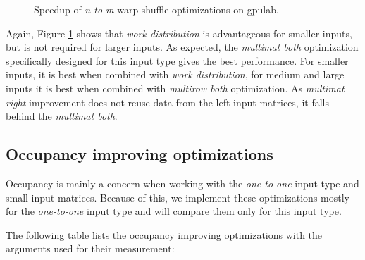 \begin{figure}[ht]
	\centering	
	\begin{subfigure}{0.49\textwidth}
		\centering
		\def\svgwidth{\textwidth}
		
	\end{subfigure}
	\hfill
	\begin{subfigure}{0.49\textwidth}
		\centering
		\def\svgwidth{\textwidth}
		
	\end{subfigure}
	\hfill
	\begin{subfigure}{0.49\textwidth}
		\centering
		\def\svgwidth{\textwidth}
		
	\end{subfigure}
	
	\caption{Speedup of \textit{n-to-m} warp shuffle optimizations on gpulab.}
	\label{fig:warp_shuffle_n_to_m_results}
\end{figure}

Again, Figure \ref{fig:warp_shuffle_n_to_m_results} shows that \textit{work distribution} is advantageous for smaller inputs, but is not required for larger inputs. As expected, the \textit{multimat both} optimization specifically designed for this input type gives the best performance. For smaller inputs, it is best when combined with \textit{work distribution}, for medium and large inputs it is best when combined with \textit{multirow both} optimization. As \textit{multimat right} improvement does not reuse data from the left input matrices, it falls behind the \textit{multimat both}.

\subsection{Occupancy improving optimizations}
\label{sec:results_occupancy_improvements}

Occupancy is mainly a concern when working with the \textit{one-to-one} input type and small input matrices. Because of this, we implement these optimizations mostly for the \textit{one-to-one} input type and will compare them only for this input type. 

The following table lists the occupancy improving optimizations with the arguments used for their measurement:

